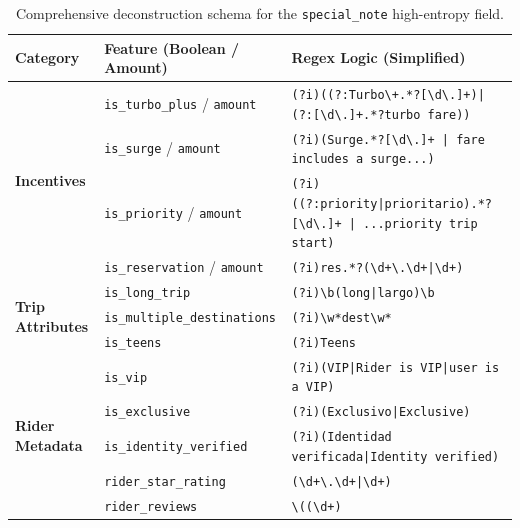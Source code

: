 \begin{table}[H]
    \centering
    \scriptsize %
    \begin{tabularx}{\textwidth}{l l X}
        \toprule
        \textbf{Category} & \textbf{Feature (Boolean / Amount)} & \textbf{Regex Logic (Simplified)} \\
        \midrule
        \multirow{4}{*}{\textbf{Incentives}} 
        & \texttt{is\_turbo\_plus} / \texttt{amount} & \texttt{(?i)((?:Turbo\textbackslash+.*?[\textbackslash d\textbackslash .]+)|(?:[\textbackslash d\textbackslash .]+.*?turbo fare))} \\
        & \texttt{is\_surge} / \texttt{amount} & \texttt{(?i)(Surge.*?[\textbackslash d\textbackslash .]+ | fare includes a surge...)} \\
        & \texttt{is\_priority} / \texttt{amount} & \texttt{(?i)((?:priority|prioritario).*?[\textbackslash d\textbackslash .]+ | ...priority trip start)} \\
        & \texttt{is\_reservation} / \texttt{amount} & \texttt{(?i)res.*?(\textbackslash d+\textbackslash .\textbackslash d+|\textbackslash d+)} \\
        \midrule
        \multirow{3}{*}{\textbf{Trip Attributes}} 
        & \texttt{is\_long\_trip} & \texttt{(?i)\textbackslash b(long|largo)\textbackslash b} \\
        & \texttt{is\_multiple\_destinations} & \texttt{(?i)\textbackslash w*dest\textbackslash w*} \\
        & \texttt{is\_teens} & \texttt{(?i)Teens} \\
        \midrule
        \multirow{5}{*}{\textbf{Rider Metadata}} 
        & \texttt{is\_vip} & \texttt{(?i)(VIP|Rider is VIP|user is a VIP)} \\
        & \texttt{is\_exclusive} & \texttt{(?i)(Exclusivo|Exclusive)} \\
        & \texttt{is\_identity\_verified} & \texttt{(?i)(Identidad verificada|Identity verified)} \\
        & \texttt{rider\_star\_rating} & \texttt{(\textbackslash d+\textbackslash .\textbackslash d+|\textbackslash d+)} \\
        & \texttt{rider\_reviews} & \texttt{\textbackslash ((\textbackslash d+)} \\
        \bottomrule
    \end{tabularx}
    \caption{Comprehensive deconstruction schema for the \texttt{special\_note} high-entropy field.}
    \label{tab:regex_logic}
\end{table}



